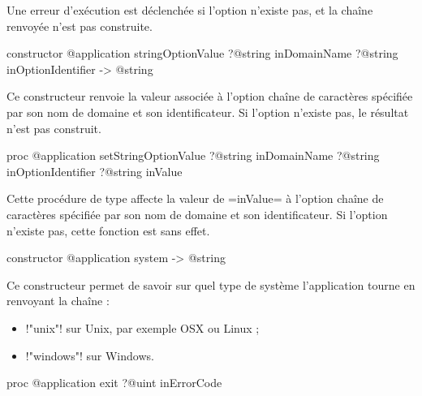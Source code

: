 Une erreur d'exécution est déclenchée si l'option n'existe pas, et la chaîne renvoyée n'est pas construite.





\begin{galgas3box}
constructor @application stringOptionValue
    ?@string inDomainName
    ?@string inOptionIdentifier -> @string
\end{galgas3box}

Ce constructeur renvoie la valeur associée à l'option chaîne de caractères spécifiée par son nom de domaine et son identificateur. Si l'option n'existe pas, le résultat n'est pas construit.






\begin{galgas3box}
proc @application setStringOptionValue
    ?@string inDomainName
    ?@string inOptionIdentifier
    ?@string inValue
\end{galgas3box}

Cette procédure de type affecte la valeur de \ggst=inValue= à l'option chaîne de caractères spécifiée par son nom de domaine et son identificateur. Si l'option n'existe pas, cette fonction est sans effet.












\begin{galgas3box}
constructor @application system -> @string
\end{galgas3box}

Ce constructeur permet de savoir sur quel type de système l'application tourne en renvoyant la chaîne :
\begin{itemize}
  \item \ggst!"unix"! sur Unix, par exemple OSX ou Linux ;
  \item \ggst!"windows"! sur Windows.
\end{itemize}






\begin{galgas3box}
proc @application exit ?@uint inErrorCode
\end{galgas3box}

